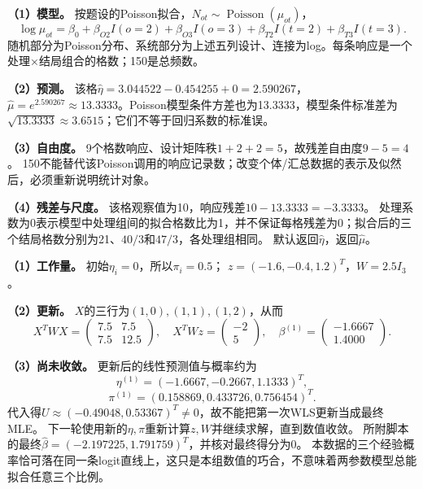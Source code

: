 \textbf{（1）模型。} 按题设的Poisson拟合，$N_{ot}\sim\operatorname{Poisson}(\mu_{ot})$，
\[\log\mu_{ot}=\beta_0+\beta_{O2}I(o=2)+\beta_{O3}I(o=3)
+\beta_{T2}I(t=2)+\beta_{T3}I(t=3).\]
随机部分为Poisson分布、系统部分为上述五列设计、连接为log。每条响应是一个处理×结局组合的格数；150是总频数。
\par\textbf{（2）预测。} 该格$\hat\eta=3.044522-0.454255+0=2.590267$，
$\hat\mu=e^{2.590267}\approx13.3333$。Poisson模型条件方差也为13.3333，模型条件标准差为$\sqrt{13.3333}\approx3.6515$；它们不等于回归系数的标准误。
\par\textbf{（3）自由度。} 9个格数响应、设计矩阵秩$1+2+2=5$，故残差自由度$9-5=4$。
150不能替代该Poisson调用的响应记录数；改变个体/汇总数据的表示及似然后，必须重新说明统计对象。
\par\textbf{（4）残差与尺度。} 该格观察值为10，响应残差$10-13.3333=-3.3333$。
处理系数为0表示模型中处理组间的拟合格数比为1，并不保证每格残差为0；拟合后的三个结局格数分别为21、$40/3$和$47/3$，各处理组相同。
默认返回$\hat\eta$，返回$\hat\mu$。
\par\nobreak\smallskip{}

\par\noindent\begin{minipage}{\linewidth}
\textbf{（1）工作量。} 初始$\eta_i=0$，所以$\pi_i=0.5$；
$z=(-1.6,-0.4,1.2)^T$，$W=2.5I_3$。
\par\textbf{（2）更新。} $X$的三行为$(1,0),(1,1),(1,2)$，从而
\[X^TWX=\begin{pmatrix}7.5&7.5\\7.5&12.5\end{pmatrix},\quad
X^TWz=\begin{pmatrix}-2\\5\end{pmatrix},\quad
\beta^{(1)}=\begin{pmatrix}-1.6667\\1.4000\end{pmatrix}.\]
\par\textbf{（3）尚未收敛。} 更新后的线性预测值与概率约为
\[\eta^{(1)}=(-1.6667,-0.2667,1.1333)^T,\]
\[\pi^{(1)}=(0.158869,0.433726,0.756454)^T.\]
代入得$U\approx(-0.49048,0.53367)^T\ne0$，故不能把第一次WLS更新当成最终MLE。
下一轮使用新的$\eta,\pi$重新计算$z,W$并继续求解，直到数值收敛。
所附脚本的最终$\hat\beta=(-2.197225,1.791759)^T$，并核对最终得分为0。
本数据的三个经验概率恰可落在同一条logit直线上，这只是本组数值的巧合，不意味着两参数模型总能拟合任意三个比例。
\par\nobreak\smallskip{}
\end{minipage}\par\medskip

